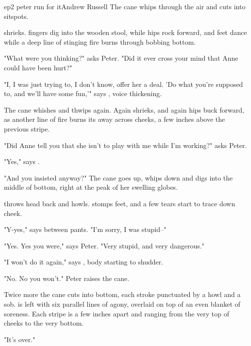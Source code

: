\documentclass{book}
\begin{document}
\begin{childnode}{ep2 peter run for it}{Andrew Russell}
    The cane whips through the air and cuts into \names{} sitspots.

    \name{} shrieks. \HisHer{} fingers dig into the wooden stool, while \hisher{} hips rock forward, and \hisher{} feet dance while a deep line of stinging fire burns through \hisher{} bobbing 
    bottom.

    "What were you thinking?" asks Peter. "Did it ever cross your mind that Anne could have been hurt?"

    "I, I was just trying to, I don't know, offer her a deal. 'Do what you're supposed to, and we'll have some fun,'" says \name{}, \hisher{} voice thickening.

    The cane whishes and thwips again. Again \name{} shrieks, and again \hisher{} hips buck forward, as another line of fire burns its away across \names{} cheeks, a few inches above the previous stripe.

    "Did Anne tell you that she isn't to play with me while I'm working?" asks Peter.

    "Yes," says \name{}.

    "And you insisted anyway?" The cane goes up, whips down and digs into the middle of \names{} bottom, right at the peak of her swelling globes.

    \name{} throws \hisher{} head back and howls. \HeShe{} stomps \hisher{} feet, and a few tears start to trace down \hisher{} cheek.

    "Y-yes," says \name{} between pants. "I'm sorry, I was stupid--"

    "Yes. Yes you were," says Peter. "Very stupid, and very dangerous."

    "I won't do it again," says \name{}, \hisher{} body starting to shudder.

    "No. No you won't." Peter raises the cane.

    Twice more the cane cuts into \names{} bottom, each stroke punctuated by a howl and a sob. \name{} is left with six parallel lines of agony, overlaid on top of an even blanket of soreness. Each stripe is a few inches apart and ranging from the very top of 
    \hisher{} cheeks to the very bottom.

    "It's over." 


\end{childnode}
\end{document}
